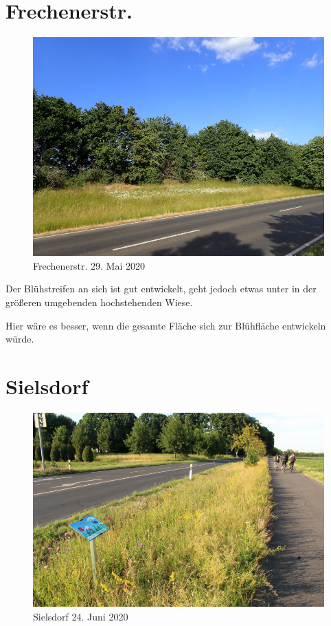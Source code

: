 \documentclass[10pt]{article}
\begin{document}
\section{Frechenerstr.}
\begin{figure}[h!]
  \includegraphics[width=\linewidth]{img/frechenerstr/mai.jpg}
  \caption{Frechenerstr. 29. Mai 2020}
\end{figure}

Der Blühstreifen an sich ist gut entwickelt, geht jedoch etwas unter in der größeren umgebenden hochstehenden Wiese.

Hier wäre es besser, wenn die gesamte Fläche sich zur Blühfläche entwickeln würde.

\clearpage
\section{Sielsdorf}
\begin{figure}[h!]
  \includegraphics[width=\linewidth]{img/sielsdorf/juni.jpg}
  \caption{Sielsdorf 24. Juni 2020}
\end{figure}
\end{document}

